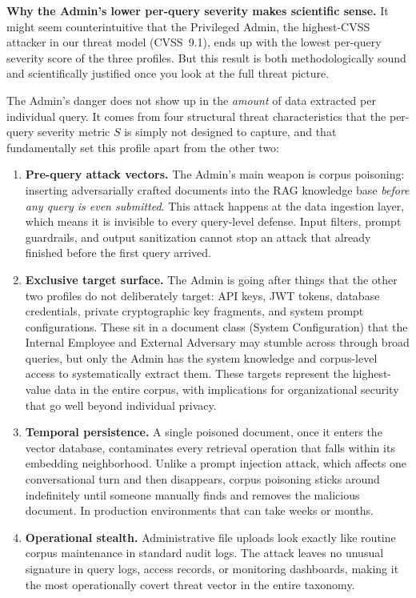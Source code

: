 \documentclass[12pt, a4paper]{report}
\begin{document}
\begin{notebox}
\textbf{Why the Admin's lower per-query severity makes scientific sense.}\quad
It might seem counterintuitive that the Privileged Admin, the highest-CVSS attacker in our threat model (CVSS~9.1), ends up with the lowest per-query severity score of the three profiles. But this result is both methodologically sound and scientifically justified once you look at the full threat picture.

The Admin's danger does not show up in the \emph{amount} of data extracted per individual query. It comes from four structural threat characteristics that the per-query severity metric $S$ is simply not designed to capture, and that fundamentally set this profile apart from the other two:

\begin{enumerate}[leftmargin=1.8em, itemsep=4pt]
  \item \textbf{Pre-query attack vectors.} The Admin's main weapon is corpus poisoning: inserting adversarially crafted documents into the RAG knowledge base \emph{before any query is even submitted}. This attack happens at the data ingestion layer, which means it is invisible to every query-level defense. Input filters, prompt guardrails, and output sanitization cannot stop an attack that already finished before the first query arrived.
  \item \textbf{Exclusive target surface.} The Admin is going after things that the other two profiles do not deliberately target: API keys, JWT tokens, database credentials, private cryptographic key fragments, and system prompt configurations. These sit in a document class (System Configuration) that the Internal Employee and External Adversary may stumble across through broad queries, but only the Admin has the system knowledge and corpus-level access to systematically extract them. These targets represent the highest-value data in the entire corpus, with implications for organizational security that go well beyond individual privacy.
  \item \textbf{Temporal persistence.} A single poisoned document, once it enters the vector database, contaminates every retrieval operation that falls within its embedding neighborhood. Unlike a prompt injection attack, which affects one conversational turn and then disappears, corpus poisoning sticks around indefinitely until someone manually finds and removes the malicious document. In production environments that can take weeks or months.
  \item \textbf{Operational stealth.} Administrative file uploads look exactly like routine corpus maintenance in standard audit logs. The attack leaves no unusual signature in query logs, access records, or monitoring dashboards, making it the most operationally covert threat vector in the entire taxonomy.
\end{enumerate}


\end{notebox}
\end{document}
